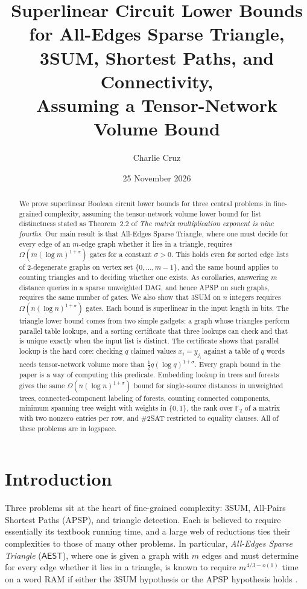\documentclass[11pt]{article}
\title{Superlinear Circuit Lower Bounds for All-Edges Sparse Triangle,\\
3SUM, Shortest Paths, and Connectivity,\\
Assuming a Tensor-Network Volume Bound}
\author{Charlie Cruz}
\date{25 November 2026}
\theoremstyle{definition}
\theoremstyle{remark}
\newcommand{\F}{\mathbb{F}}
\newcommand{\AEST}{\mathsf{AEST}}
\begin{document}
\maketitle

\begin{abstract}
We prove superlinear Boolean circuit lower bounds for three central
problems in fine-grained complexity, assuming the tensor-network volume
lower bound for list distinctness stated as Theorem~2.2 of \emph{The matrix
multiplication exponent is nine fourths}. Our main result is that
All-Edges Sparse Triangle, where one must decide for every edge of an
$m$-edge graph whether it lies in a triangle, requires
$\Omega(m(\log m)^{1+\sigma})$ gates for a constant $\sigma>0$. This holds
even for sorted edge lists of 2-degenerate graphs on vertex set
$\{0,\dots,m-1\}$, and the same bound applies to counting triangles and to
deciding whether one exists. As corollaries, answering $m$ distance
queries in a sparse unweighted DAG, and hence APSP on such graphs, requires
the same number of gates. We also show that 3SUM on $n$ integers requires
$\Omega(n(\log n)^{1+\sigma})$ gates. Each bound is superlinear in the input
length in bits. The triangle lower bound comes from two simple gadgets: a
graph whose triangles perform parallel table lookups, and a sorting
certificate that three lookups can check and that is unique exactly when
the input list is distinct. The certificate shows that parallel lookup is
the hard core: checking $q$ claimed values $x_i=y_{j_i}$ against a table
of $q$ words needs tensor-network volume more than $\tfrac12q(\log
q)^{1+\sigma}$. Every graph bound in the paper is a way of computing this
predicate. Embedding lookup in trees and forests gives the same
$\Omega(n(\log n)^{1+\sigma})$ bound for single-source distances in
unweighted trees, connected-component labeling of forests, counting
connected components, minimum spanning tree weight with weights in
$\{0,1\}$, the rank over $\F_2$ of a matrix with two nonzero entries per
row, and $\#$2SAT restricted to equality clauses. All of these problems
are in logspace.
\end{abstract}

\section{Introduction}

Three problems sit at the heart of fine-grained complexity: 3SUM,
All-Pairs Shortest Paths (APSP), and triangle detection. Each is believed
to require essentially its textbook running time, and a large web of
reductions ties their complexities to those of many other problems. In
particular, \emph{All-Edges Sparse Triangle} ($\AEST$), where one is given
a graph with $m$ edges and must determine for every edge whether it lies in
a triangle, is known to require $m^{4/3-o(1)}$ time on a word RAM if either
the 3SUM hypothesis or the APSP hypothesis holds \cite{VWX}.
\end{document}

